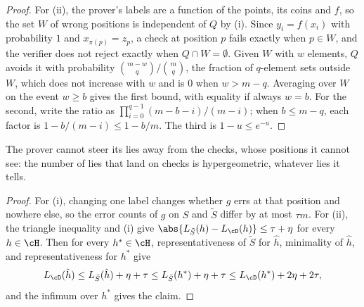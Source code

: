 \begin{refsection}
\begin{proof}
For (ii), the prover's labels are a function of the points, its coins and $f$, so the set $W$ of wrong positions is independent of $Q$ by (i). Since $y_i=f(x_i)$ with probability $1$ and $x_{\pi(p)}=z_p$, a check at position $p$ fails exactly when $p\in W$, and the verifier does not reject exactly when $Q\cap W=\emptyset$. Given $W$ with $w$ elements, $Q$ avoids it with probability $\binom{m-w}{q}/\binom mq$, the fraction of $q$-element sets outside $W$, which does not increase with $w$ and is $0$ when $w>m-q$. Averaging over $W$ on the event $w\ge b$ gives the first bound, with equality if always $w=b$. For the second, write the ratio as $\prod_{i=0}^{q-1}(m-b-i)/(m-i)$; when $b\le m-q$, each factor is $1-b/(m-i)\le1-b/m$. The third is $1-u\le e^{-u}$.
\end{proof}

The prover cannot steer its lies away from the checks, whose positions it cannot see: the number of lies that land on checks is hypergeometric, whatever lies it tells.


\begin{proof}
For (i), changing one label changes whether $g$ errs at that position and nowhere else, so the error counts of $g$ on $S$ and $\tilde S$ differ by at most $\tau m$. For (ii), the triangle inequality and (i) give $\abs{L_{\tilde S}(h)-L_\cD(h)}\le\tau+\eta$ for every $h\in\cH$. Then for every $h^*\in\cH$, representativeness of $\tilde S$ for $\hat h$, minimality of $\hat h$, and representativeness for $h^*$ give
\[L_\cD(\hat h)\le L_{\tilde S}(\hat h)+\eta+\tau\le L_{\tilde S}(h^*)+\eta+\tau\le L_\cD(h^*)+2\eta+2\tau,\]
and the infimum over $h^*$ gives the claim.
\end{proof}


\end{refsection}

